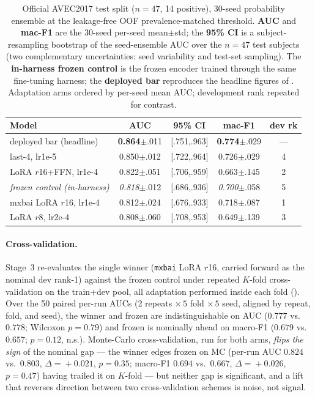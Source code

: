 \begin{table}[t]
\caption{Official AVEC2017 test split ($n\!=\!47$, 14 positive), 30-seed
probability ensemble at the leakage-free OOF prevalence-matched threshold.
\textbf{AUC} and \textbf{mac-F1} are the 30-seed per-seed mean$\pm$std; the
\textbf{95\% CI} is a subject-resampling bootstrap of the seed-ensemble AUC over
the $n\!=\!47$ test subjects (two complementary uncertainties: seed variability and
test-set sampling). The \textbf{in-harness frozen control} is the frozen encoder
trained through the same fine-tuning harness; the \textbf{deployed bar} reproduces
the headline figures of . Adaptation arms ordered by
per-seed mean AUC; development rank repeated for contrast.}
\label{tab:ft-test}
\centering\small
\setlength{\tabcolsep}{4pt}
\begin{tabular}{@{}lcccc@{}}
\toprule
\textbf{Model} & \textbf{AUC} & \textbf{95\% CI} & \textbf{mac-F1} & \textbf{dev rk} \\
\midrule
deployed bar (headline)        & \textbf{0.864}{\footnotesize$\pm$.011} & [.751,.963] & \textbf{0.774}{\footnotesize$\pm$.029} & --- \\
\midrule
last-4, lr1e-5                 & 0.850{\footnotesize$\pm$.012} & [.722,.964] & 0.726{\footnotesize$\pm$.029} & 4 \\
LoRA $r$16+FFN, lr1e-4         & 0.822{\footnotesize$\pm$.051} & [.706,.959] & 0.663{\footnotesize$\pm$.145} & 2 \\
\textit{frozen control (in-harness)} & \textit{0.818}{\footnotesize$\pm$.012} & [.686,.936] & \textit{0.700}{\footnotesize$\pm$.058} & 5 \\
mxbai LoRA $r$16, lr1e-4       & 0.812{\footnotesize$\pm$.024} & [.676,.933] & 0.718{\footnotesize$\pm$.087} & 1 \\
LoRA $r$8, lr2e-4              & 0.808{\footnotesize$\pm$.060} & [.708,.953] & 0.649{\footnotesize$\pm$.139} & 3 \\
\bottomrule
\end{tabular}
\end{table}

\paragraph{Cross-validation.} Stage~3 re-evaluates the single winner
(\texttt{mxbai} LoRA $r$16, carried forward as the nominal dev rank-1) against the
frozen control under repeated $K$-fold cross-validation on the train+dev pool, all
adaptation performed inside each fold (). Over the 50 paired
per-run AUCs (2 repeats $\times\,5$ fold $\times\,5$ seed, aligned by repeat, fold,
and seed), the winner and frozen are indistinguishable on AUC ($0.777$ vs.\ $0.778$;
Wilcoxon $p=0.79$) and frozen is nominally ahead on macro-F1 ($0.679$ vs.\ $0.657$;
$p=0.12$, n.s.). Monte-Carlo cross-validation, run for both arms,
\emph{flips the sign} of the nominal gap --- the winner
edges frozen on MC (per-run AUC $0.824$ vs.\ $0.803$, $\Delta\!=\!+0.021$,
$p=0.35$; macro-F1 $0.694$ vs.\ $0.667$, $\Delta\!=\!+0.026$, $p=0.47$) having
trailed it on $K$-fold --- but neither gap is significant, and a lift that
reverses direction between two cross-validation schemes is noise, not signal.

